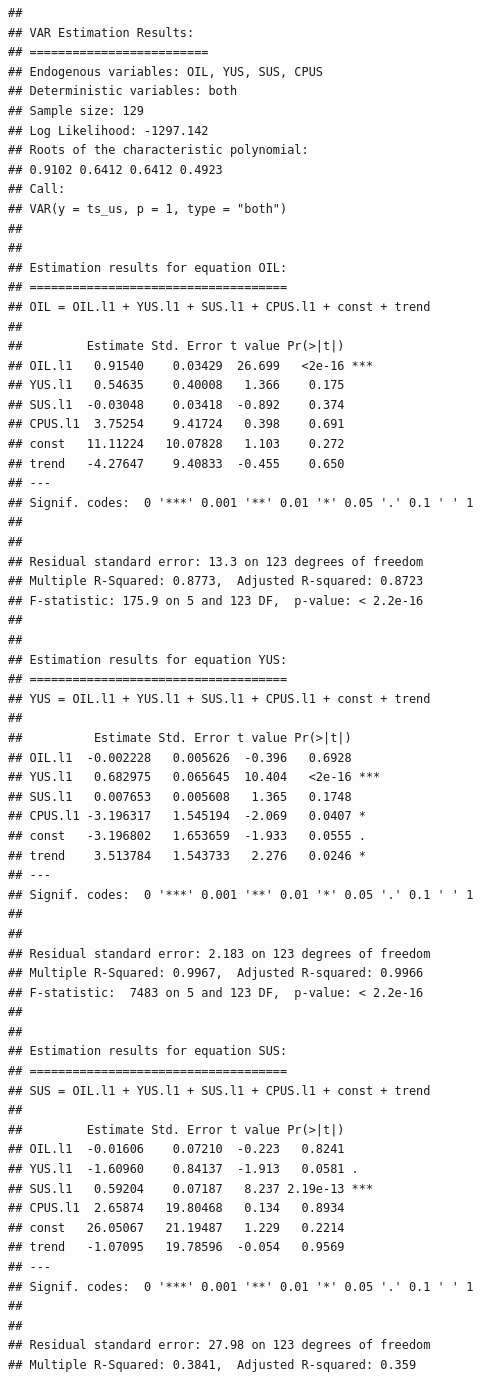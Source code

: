 \documentclass[11pt,preprint, authoryear]{elsarticle}
\numberwithin{equation}{section}
\numberwithin{figure}{section}
\numberwithin{table}{section}
\begin{document}
\begin{verbatim}
## 
## VAR Estimation Results:
## ========================= 
## Endogenous variables: OIL, YUS, SUS, CPUS 
## Deterministic variables: both 
## Sample size: 129 
## Log Likelihood: -1297.142 
## Roots of the characteristic polynomial:
## 0.9102 0.6412 0.6412 0.4923
## Call:
## VAR(y = ts_us, p = 1, type = "both")
## 
## 
## Estimation results for equation OIL: 
## ==================================== 
## OIL = OIL.l1 + YUS.l1 + SUS.l1 + CPUS.l1 + const + trend 
## 
##         Estimate Std. Error t value Pr(>|t|)    
## OIL.l1   0.91540    0.03429  26.699   <2e-16 ***
## YUS.l1   0.54635    0.40008   1.366    0.175    
## SUS.l1  -0.03048    0.03418  -0.892    0.374    
## CPUS.l1  3.75254    9.41724   0.398    0.691    
## const   11.11224   10.07828   1.103    0.272    
## trend   -4.27647    9.40833  -0.455    0.650    
## ---
## Signif. codes:  0 '***' 0.001 '**' 0.01 '*' 0.05 '.' 0.1 ' ' 1
## 
## 
## Residual standard error: 13.3 on 123 degrees of freedom
## Multiple R-Squared: 0.8773,  Adjusted R-squared: 0.8723 
## F-statistic: 175.9 on 5 and 123 DF,  p-value: < 2.2e-16 
## 
## 
## Estimation results for equation YUS: 
## ==================================== 
## YUS = OIL.l1 + YUS.l1 + SUS.l1 + CPUS.l1 + const + trend 
## 
##          Estimate Std. Error t value Pr(>|t|)    
## OIL.l1  -0.002228   0.005626  -0.396   0.6928    
## YUS.l1   0.682975   0.065645  10.404   <2e-16 ***
## SUS.l1   0.007653   0.005608   1.365   0.1748    
## CPUS.l1 -3.196317   1.545194  -2.069   0.0407 *  
## const   -3.196802   1.653659  -1.933   0.0555 .  
## trend    3.513784   1.543733   2.276   0.0246 *  
## ---
## Signif. codes:  0 '***' 0.001 '**' 0.01 '*' 0.05 '.' 0.1 ' ' 1
## 
## 
## Residual standard error: 2.183 on 123 degrees of freedom
## Multiple R-Squared: 0.9967,  Adjusted R-squared: 0.9966 
## F-statistic:  7483 on 5 and 123 DF,  p-value: < 2.2e-16 
## 
## 
## Estimation results for equation SUS: 
## ==================================== 
## SUS = OIL.l1 + YUS.l1 + SUS.l1 + CPUS.l1 + const + trend 
## 
##         Estimate Std. Error t value Pr(>|t|)    
## OIL.l1  -0.01606    0.07210  -0.223   0.8241    
## YUS.l1  -1.60960    0.84137  -1.913   0.0581 .  
## SUS.l1   0.59204    0.07187   8.237 2.19e-13 ***
## CPUS.l1  2.65874   19.80468   0.134   0.8934    
## const   26.05067   21.19487   1.229   0.2214    
## trend   -1.07095   19.78596  -0.054   0.9569    
## ---
## Signif. codes:  0 '***' 0.001 '**' 0.01 '*' 0.05 '.' 0.1 ' ' 1
## 
## 
## Residual standard error: 27.98 on 123 degrees of freedom
## Multiple R-Squared: 0.3841,  Adjusted R-squared: 0.359 

\end{verbatim}
\end{document}
